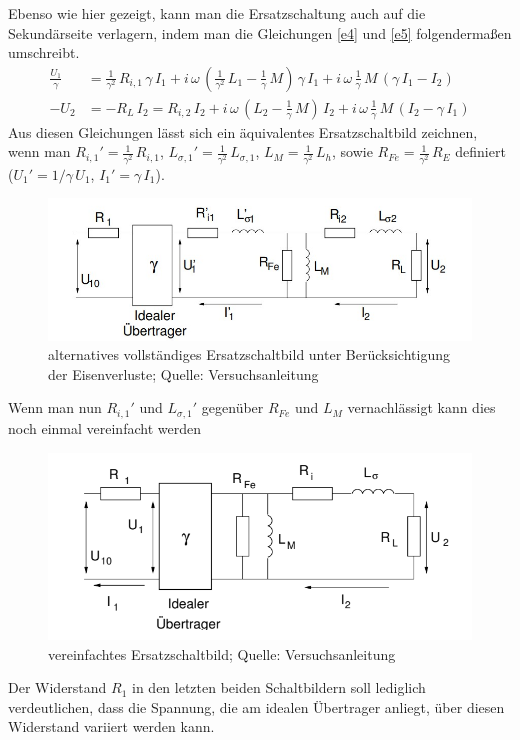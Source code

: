 \documentclass[a4paper, 12pt,]{scrartcl}
\begin{document}
Ebenso wie hier gezeigt, kann man die Ersatzschaltung auch auf die Sekundärseite verlagern, indem man die Gleichungen \ref{e4} und \ref{e5} folgendermaßen umschreibt.
\begin{align}\frac{U_1}{\gamma}&=\frac{1}{\gamma^2}\,R_{i,1}\,\gamma\,I_1+i\,\omega\,\left(\frac{1}{\gamma^2}\,L_1-\frac{1}{\gamma}\,M\right)\,\gamma\,I_1+i\,\omega\,\frac{1}{\gamma}\,M\,\left(\gamma\,I_1-I_2\right)\\
-U_2&=-R_L\,I_2=R_{i,2}\,I_2+i\,\omega\,\left(L_2-\frac{1}{\gamma}\,M\right)\,I_2+i\,\omega\,\frac{1}{\gamma}\,M\,\left(I_2-\gamma\,I_1\right)\end{align}
Aus diesen Gleichungen lässt sich ein äquivalentes Ersatzschaltbild zeichnen, wenn man $R_{i,1}'=\frac{1}{\gamma^2}\,R_{i,1}$, $L_{\sigma,1}'=\frac{1}{\gamma^2}\,L_{\sigma,1}$, $L_M=\frac{1}{\gamma^2}\,L_h$, sowie $R_{Fe}=\frac{1}{\gamma^2}\,R_{E}$ definiert ($U_1'=1/\gamma\,U_1$, $I_1'=\gamma\,I_1$).
\begin{figure}[H]\centering\includegraphics[scale=0.6]{ESB3}\caption{alternatives vollständiges Ersatzschaltbild unter Berücksichtigung der Eisenverluste; Quelle: Versuchsanleitung}\end{figure}
Wenn man nun $R_{i,1}'$ und $L_{\sigma,1}'$ gegenüber $R_{Fe}$ und $L_M$ vernachlässigt kann dies noch einmal vereinfacht werden
\begin{figure}[H]\centering\includegraphics[scale=0.6]{ESB4}\caption{vereinfachtes Ersatzschaltbild; Quelle: Versuchsanleitung}\end{figure}
Der Widerstand $R_1$ in den letzten beiden Schaltbildern soll lediglich verdeutlichen, dass die Spannung, die am idealen Übertrager anliegt, über diesen Widerstand variiert werden kann.
\end{document}
